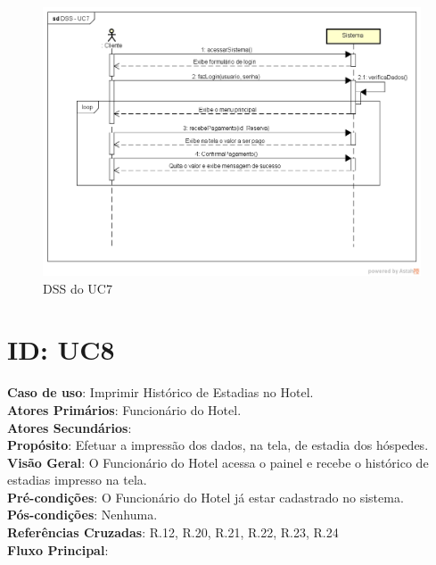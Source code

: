 \documentclass[notitlepage]{article}
\begin{document}
\begin{figure}[!htbp]
	\centering
  \includegraphics[scale=0.65]{UC7.png}
  \caption{DSS do UC7}
  \label{fig:UC7}
\end{figure}

\clearpage

\section{ID: UC8}
\noindent\textbf{Caso de uso}: Imprimir Histórico de Estadias no Hotel.\\
\textbf{Atores Primários}: Funcionário do Hotel. \\
\textbf{Atores Secundários}: \\
\textbf{Propósito}: Efetuar a impressão dos dados, na tela, de estadia dos hóspedes.\\
\textbf{Visão Geral}: O Funcionário do Hotel acessa o painel e recebe o histórico de estadias impresso na tela.\\
\textbf{Pré-condições}: O Funcionário do Hotel já estar cadastrado no sistema.\\
\textbf{Pós-condições}: Nenhuma.\\
\textbf{Referências Cruzadas}: R.12, R.20, R.21, R.22, R.23, R.24\\
\newline
\textbf{Fluxo Principal}:\\
\end{document}
